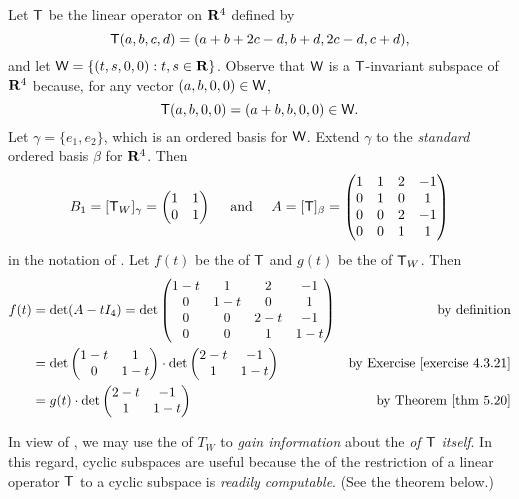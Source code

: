 \begin{example} \label{example 5.4.5}
Let \(\textsf{T}\) be the linear operator on \(\mathbf{R}^4\) defined by
\[
    \textsf{T}(a, b, c, d) = (a + b + 2c - d, b + d, 2c - d, c + d),
\]
and let \(\textsf{W} = \{ (t, s, 0, 0) : t, s \in \mathbf{R} \}\).
Observe that \(\textsf{W}\) is a \(\textsf{T}\)-invariant subspace of \(\mathbf{R}^4\) because, for any vector \((a, b, 0, 0) \in \textsf{W}\),
\[
    \textsf{T}(a, b, 0, 0) = (a + b, b, 0, 0) \in \textsf{W}.
\]
Let \(\gamma = \{ e_1, e_2 \}\), which is an ordered basis for \(\textsf{W}\).
Extend \(\gamma\) to the \emph{standard} ordered basis \(\beta\) for \(\mathbf{R}^4\).
Then
\[
    B_1 = [\textsf{T}_W]_{\gamma} = \begin{pmatrix} 1 & 1 \\ 0 & 1 \end{pmatrix}
    \quad \text{ and } \quad
    A = [\textsf{T}]_{\beta} = \begin{pmatrix} 1 & 1 & 2 & -1 \\ 0 & 1 & 0 & 1 \\ 0 & 0 & 2 & -1 \\ 0 & 0 & 1 & 1 \end{pmatrix}
\]
in the notation of .
Let \(f(t)\) be the \CPOLY{} of \(\textsf{T}\) and \(g(t)\) be the \CPOLY{} of \(\textsf{T}_W\).
Then
\begin{align*}
    f(t) & = \det(A - tI_4) = \det \begin{pmatrix} 1-t & 1 & 2 & -1 \\ 0 & 1-t & 0 & 1 \\ 0 & 0 & 2-t & -1 \\ 0 & 0 & 1 & 1-t \end{pmatrix} & \text{by definition} \\
         & = \det \begin{pmatrix} 1-t & 1 \\ 0 & 1-t \end{pmatrix} \cdot \det \begin{pmatrix} 2-t & -1 \\ 1 & 1-t \end{pmatrix} & \text{by \EXEC{4.3.21}} \\
         & = g(t) \cdot \det \begin{pmatrix} 2-t & -1 \\ 1 & 1-t \end{pmatrix} & \text{by \THM{5.20}}
\end{align*}
\end{example}

\begin{remark} \label{remark 5.4.3}
In view of , we may use the \CPOLY{} of \(T_W\) to \emph{gain information} about the \CPOLY{} \emph{of \(\textsf{T}\) itself}.
In this regard, cyclic subspaces are useful because the \CPOLY{} of the restriction of a linear operator \(\textsf{T}\) to a cyclic subspace is \emph{readily computable}.
(See the theorem below.)
\end{remark}


